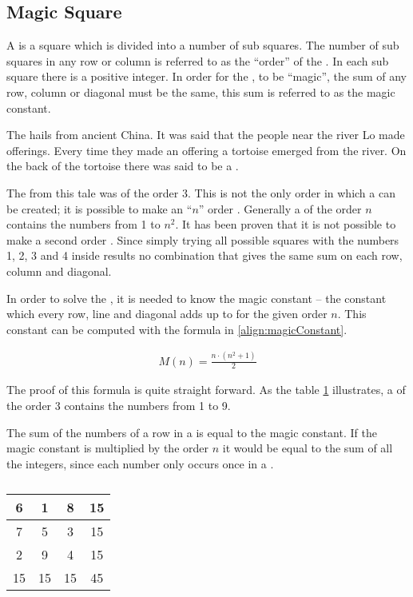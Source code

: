 \subsection{Magic Square}
\label{sec:magicSquare}
A \msquare{} is a square which is divided into a number of sub squares. The number of sub squares in any row or column is referred to as the ``order'' of the \msquare{}. In each sub square there is a positive integer. In order for the \msquare{}, to be ``magic'', the sum of any row, column or diagonal must be the same, this sum is referred to as the magic constant.

The \msquare{}\cite{aiden06} hails from ancient China. It was said that the people near the river Lo made offerings. Every time they made an offering a tortoise emerged from the river. On the back of the tortoise there was said to be a \msquare{}.

The \msquare{} from this tale was of the order 3. This is not the only order in which a \msquare{} can be created; it is possible to make an ``$n$'' order \msquare{}. Generally a \msquare{} of the order $n$ contains the numbers from 1 to $n^2$. It has been proven that it is not possible to make a second order \msquare{}. Since simply trying all possible squares with the numbers 1, 2, 3 and 4 inside results no combination that gives the same sum on each row, column and diagonal.

In order to solve the \msquare{}, it is needed to know the magic constant -- the constant which every row, line and diagonal adds up to for the given order $n$. This constant can be computed with the formula in \ref{align:magicConstant}.

\begin{align}
\label{align:magicConstant}
	M(n) = \frac{n \cdot (n^2+1)}{2}
\end{align}

The proof of this formula is quite straight forward. As the table \ref{tab:magicSquareOrder3} illustrates, a \msquare{} of the order 3 contains the numbers from 1 to 9.

The sum of the numbers of a row in a \msquare{} is equal to the magic constant. If the magic constant is multiplied by the order $n$ it would be equal to the sum of all the integers, since each number only occurs once in a \msquare{}.

\renewcommand{\arraystretch}{1.3}
\begin{table}[h]
	\centering
		\begin{tabular}{|c|c|c |@{\vrules}| c|}
			\hline
			6&1&8&15 \\
			\hline
			7&5&3&15 \\
			\hline
			2&9&4&15 \\
			\noalign{\hrules}
			15&15&15&45 \\
			\hline
		\end{tabular}
	\caption{}
	\label{tab:magicSquareOrder3}
\end{table}

